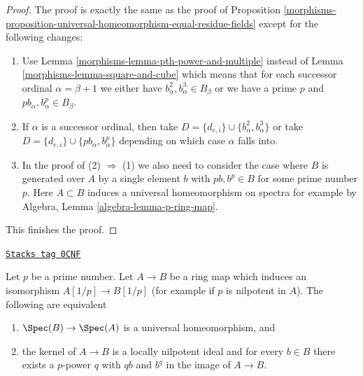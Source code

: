 \begin{proof}

The proof is exactly the same as the proof of
Proposition \ref{morphisms-proposition-universal-homeomorphism-equal-residue-fields}
except for the following changes:
\begin{enumerate}
\item Use Lemma \ref{morphisms-lemma-pth-power-and-multiple} instead of
Lemma \ref{morphisms-lemma-square-and-cube} which means that for each successor
ordinal $\alpha = \beta + 1$ we either have
$b_\alpha^2, b_\alpha^3 \in B_\beta$ or we have a prime $p$ and
$pb_\alpha, b_\alpha^p \in B_\beta$.
\item If $\alpha$ is a successor ordinal, then take
$D = \{d_{e, i}\} \cup \{b_\alpha^2, b_\alpha^3\}$ or
take $D = \{d_{e, i}\} \cup \{pb_\alpha, b_\alpha^p\}$ depending
on which case $\alpha$ falls into.
\item In the proof of (2) $\Rightarrow$ (1) we also need to consider
the case where $B$ is generated over $A$ by a single element $b$
with $pb, b^p \in B$ for some prime number $p$. Here $A \subset B$
induces a universal homeomorphism on spectra for example by
Algebra, Lemma \ref{algebra-lemma-p-ring-map}.
\end{enumerate}
This finishes the proof.
\end{proof}

\begin{lemma}
\label{morphisms-lemma-universal-homeo-iso-if-invert-p}
\href{https://stacks.math.columbia.edu/tag/0CNF}{\texttt{Stacks tag 0CNF}}

Let $p$ be a prime number. Let $A \to B$ be a ring map
which induces an isomorphism $A[1/p] \to B[1/p]$
(for example if $p$ is nilpotent in $A$).
The following are equivalent
\begin{enumerate}
\item $\Spec(B) \to \Spec(A)$ is a universal homeomorphism, and
\item the kernel of $A \to B$ is a locally nilpotent ideal and
for every $b \in B$ there exists a $p$-power $q$ with $qb$ and $b^q$
in the image of $A \to B$.
\end{enumerate}
\end{lemma}

